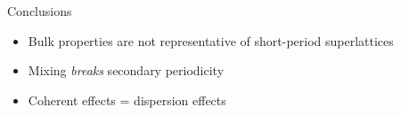 \documentclass{beamer}
\begin{document}
\begin{frame}{Conclusions}
\begin{itemize}
\item Bulk properties are not representative of short-period superlattices
\item Mixing \textit{breaks} secondary periodicity
\item Coherent effects = dispersion effects
\end{itemize}
\end{frame}

\end{document}
